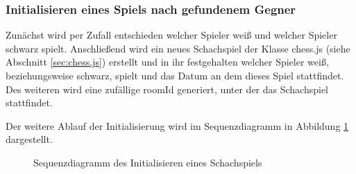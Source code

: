 \subsubsection{Initialisieren eines Spiels nach gefundenem Gegner}
Zunächst wird per Zufall entschieden welcher Spieler weiß und welcher Spieler schwarz spielt. Anschließend wird ein neues Schachspiel der Klasse chess.js (siehe Abschnitt \ref{sec:chess.js}) erstellt und in ihr festgehalten welcher Spieler weiß, beziehungsweise schwarz, spielt und das Datum an dem dieses Spiel stattfindet. Des weiteren wird eine zufällige roomId generiert, unter der das Schachspiel stattfindet.

Der weitere Ablauf der Initialisierung wird im Sequenzdiagramm in Abbildung \ref{fig:sequenz-initialize-Game} dargestellt. 

\begin{figure}[h]
\centering
{}
\caption{Sequenzdiagramm des Initialisieren eines Schachspiels}
\label{fig:sequenz-initialize-Game}
\end{figure}

